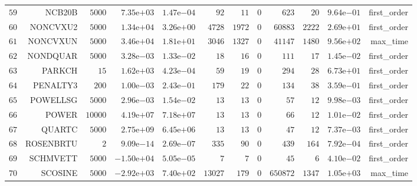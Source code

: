\begin{longtable}{rrrrrrrrrrrr}
  \(    59\) & NCB20B & \(  5000\) & \( 7.35\)e\(+03\) & \( 1.47\)e\(-04\) & \(    92\) & \(    11\) & \(     0\) & \(   623\) & \(    20\) & \( 9.64\)e\(-01\) & first\_order \\
  \(    60\) & NONCVXU2 & \(  5000\) & \( 1.34\)e\(+04\) & \( 3.26\)e\(+00\) & \(  4728\) & \(  1972\) & \(     0\) & \( 60883\) & \(  2222\) & \( 2.69\)e\(+01\) & first\_order \\
  \(    61\) & NONCVXUN & \(  5000\) & \( 3.46\)e\(+04\) & \( 1.81\)e\(+01\) & \(  3046\) & \(  1327\) & \(     0\) & \( 41147\) & \(  1480\) & \( 9.56\)e\(+02\) & max\_time \\
  \(    62\) & NONDQUAR & \(  5000\) & \( 3.28\)e\(-03\) & \( 1.33\)e\(-02\) & \(    18\) & \(    16\) & \(     0\) & \(   111\) & \(    17\) & \( 1.45\)e\(-02\) & first\_order \\
  \(    63\) & PARKCH & \(    15\) & \( 1.62\)e\(+03\) & \( 4.23\)e\(-04\) & \(    59\) & \(    19\) & \(     0\) & \(   294\) & \(    28\) & \( 6.73\)e\(+01\) & first\_order \\
  \(    64\) & PENALTY3 & \(   200\) & \( 1.00\)e\(-03\) & \( 2.43\)e\(-01\) & \(   179\) & \(    22\) & \(     0\) & \(   134\) & \(    38\) & \( 3.59\)e\(-01\) & first\_order \\
  \(    65\) & POWELLSG & \(  5000\) & \( 2.96\)e\(-03\) & \( 1.54\)e\(-02\) & \(    13\) & \(    13\) & \(     0\) & \(    57\) & \(    12\) & \( 9.98\)e\(-03\) & first\_order \\
  \(    66\) & POWER & \( 10000\) & \( 4.19\)e\(+07\) & \( 7.18\)e\(+07\) & \(    13\) & \(    13\) & \(     0\) & \(    66\) & \(    12\) & \( 1.01\)e\(-02\) & first\_order \\
  \(    67\) & QUARTC & \(  5000\) & \( 2.75\)e\(+09\) & \( 6.45\)e\(+06\) & \(    13\) & \(    13\) & \(     0\) & \(    47\) & \(    12\) & \( 7.37\)e\(-03\) & first\_order \\
  \(    68\) & ROSENBRTU & \(     2\) & \( 9.09\)e\(-14\) & \( 2.69\)e\(-07\) & \(   335\) & \(    90\) & \(     0\) & \(   439\) & \(   164\) & \( 7.92\)e\(-04\) & first\_order \\
  \(    69\) & SCHMVETT & \(  5000\) & \(-1.50\)e\(+04\) & \( 5.05\)e\(-05\) & \(     7\) & \(     7\) & \(     0\) & \(    45\) & \(     6\) & \( 4.10\)e\(-02\) & first\_order \\
  \(    70\) & SCOSINE & \(  5000\) & \(-2.92\)e\(+03\) & \( 7.40\)e\(+02\) & \( 13027\) & \(   179\) & \(     0\) & \(650872\) & \(  1347\) & \( 1.05\)e\(+03\) & max\_time \\

\end{longtable}
